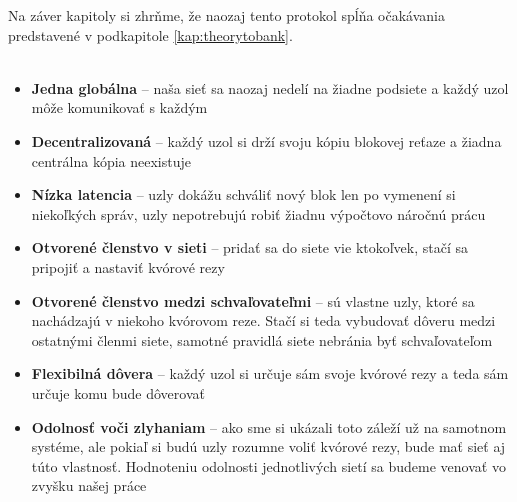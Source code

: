 \vspace{10mm}
Na záver kapitoly si zhrňme, že naozaj tento protokol spĺňa očakávania predstavené
v podkapitole \ref{kap:theorytobank}.
\\
\\

\begin{itemize}
\item  \textbf{Jedna globálna} -- naša sieť sa naozaj nedelí na žiadne podsiete
a každý uzol môže komunikovať s každým
\item  \textbf{Decentralizovaná} -- každý uzol si drží svoju kópiu blokovej reťaze
a žiadna centrálna kópia neexistuje
\item  \textbf{Nízka latencia} -- uzly dokážu schváliť nový blok len po vymenení si
niekoľkých správ, uzly nepotrebujú robiť žiadnu výpočtovo náročnú prácu
\item  \textbf{Otvorené členstvo v sieti} -- pridať sa do siete vie ktokoľvek, stačí
sa pripojiť a nastaviť kvórové rezy
\item  \textbf{Otvorené členstvo medzi schvaľovateľmi} --  sú
vlastne uzly, ktoré sa nachádzajú v niekoho kvórovom reze. Stačí si teda vybudovať
dôveru medzi ostatnými členmi siete, samotné pravidlá siete nebránia byť schvaľovateľom
\item  \textbf{Flexibilná dôvera} -- každý uzol si určuje sám svoje kvórové rezy a teda
sám určuje komu bude dôverovať
\item  \textbf{Odolnosť voči zlyhaniam} -- ako sme si ukázali toto záleží už na samotnom
systéme, ale pokiaľ si budú uzly rozumne voliť kvórové rezy, bude mať sieť aj túto vlastnosť.
Hodnoteniu odolnosti jednotlivých sietí sa budeme venovať vo zvyšku našej práce
\end{itemize}